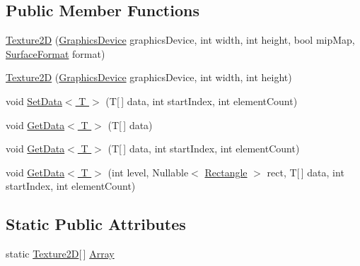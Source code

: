 \subsection*{Public Member Functions}
\begin{DoxyCompactItemize}
\item 
\hyperlink{class_microsoft_1_1_xna_1_1_framework_1_1_graphics_1_1_texture2_d_ad0f1dcfbb6519edff410c48797482336}{Texture2\+D} (\hyperlink{class_microsoft_1_1_xna_1_1_framework_1_1_graphics_1_1_graphics_device}{Graphics\+Device} graphics\+Device, int width, int height, bool mip\+Map, \hyperlink{namespace_microsoft_1_1_xna_1_1_framework_1_1_graphics_abb47f8b6c5b33dc8516f74c0e80dbfba}{Surface\+Format} format)
\item 
\hyperlink{class_microsoft_1_1_xna_1_1_framework_1_1_graphics_1_1_texture2_d_a77fa88eb12a527d3050f4faa6ef4b80f}{Texture2\+D} (\hyperlink{class_microsoft_1_1_xna_1_1_framework_1_1_graphics_1_1_graphics_device}{Graphics\+Device} graphics\+Device, int width, int height)
\item 
void \hyperlink{class_microsoft_1_1_xna_1_1_framework_1_1_graphics_1_1_texture2_d_a251ee02a9bb6007b5b5022d63c7b460f}{Set\+Data$<$ T $>$} (T\mbox{[}$\,$\mbox{]} data, int start\+Index, int element\+Count)
\item 
void \hyperlink{class_microsoft_1_1_xna_1_1_framework_1_1_graphics_1_1_texture2_d_ac7204811fe4c7b12fd954e7c7e59eba1}{Get\+Data$<$ T $>$} (T\mbox{[}$\,$\mbox{]} data)
\item 
void \hyperlink{class_microsoft_1_1_xna_1_1_framework_1_1_graphics_1_1_texture2_d_a8f7c0f18cbb84f50d8ccb0b401a0a491}{Get\+Data$<$ T $>$} (T\mbox{[}$\,$\mbox{]} data, int start\+Index, int element\+Count)
\item 
void \hyperlink{class_microsoft_1_1_xna_1_1_framework_1_1_graphics_1_1_texture2_d_a4b04725e5277a6601525295f7c169d03}{Get\+Data$<$ T $>$} (int level, Nullable$<$ \hyperlink{struct_microsoft_1_1_xna_1_1_framework_1_1_rectangle}{Rectangle} $>$ rect, T\mbox{[}$\,$\mbox{]} data, int start\+Index, int element\+Count)
\end{DoxyCompactItemize}
\subsection*{Static Public Attributes}
\begin{DoxyCompactItemize}
\item 
static \hyperlink{class_microsoft_1_1_xna_1_1_framework_1_1_graphics_1_1_texture2_d}{Texture2\+D}\mbox{[}$\,$\mbox{]} \hyperlink{class_microsoft_1_1_xna_1_1_framework_1_1_graphics_1_1_texture2_d_ae84ae122a6665ba5630988fc4f7d7c9b}{Array}
\end{DoxyCompactItemize}
